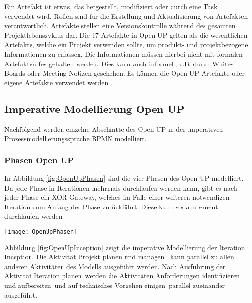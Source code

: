 Ein Artefakt ist etwas, das hergestellt, modifiziert oder durch eine Task verwendet wird. Rollen sind 
für die Erstellung und Aktualisierung von Artefakten verantwortlich. Artefakte stellen eine Versionskontrolle während des gesamten Projektlebenszyklus dar. Die 17 Artefakte in Open UP gelten als die wesentlichen Artefakte, welche ein Projekt verwenden sollte, um produkt- und projektbezogene Informationen zu erfassen. Die Informationen müssen hierbei nicht mit formalen Artefakten festgehalten werden. Dies kann auch informell, z.B. durch White-Boards oder Meeting-Notizen geschehen. Es können die Open UP Artefakte oder eigene Artefakte verwendet werden \cite{eclipseopenup}.

\subsection{Imperative Modellierung Open UP}

Nachfolgend werden einzelne Abschnitte des Open UP in der imperativen Prozessmodellierungssprache BPMN modelliert.

 \subsubsection{Phasen Open UP}

In Abbildung \ref{fig:OpenUpPhasen} sind die vier Phasen des Open UP modelliert. Da jede Phase in Iterationen mehrmals durchlaufen werden kann, gibt es nach jeder Phase ein XOR-Gateway, welches im Falle einer weiteren notwendigen Iteration zum Anfang der Phase zurückführt. Diese kann sodann erneut durchlaufen werden.

\begin{sidewaysfigure}[htp]
\begin{center}
  \texttt{[image: OpenUpPhasen]} %
  \caption{Phasen Open UP- imperativ}
  \label{fig:OpenUpPhasen}
\end{center}
\end{sidewaysfigure}

Abbildung \ref{fig:OpenUpInception} zeigt die imperative Modellierung der Iteration Inception. Die Aktivität \grqq Projekt planen und managen \grqq \ kann parallel zu allen anderen Aktivitäten des Modells ausgeführt werden.\newline
Nach Ausführung der Aktivität \grqq Iteration planen\grqq \ werden die Aktivitäten \grqq Anforderungen identifizieren und aufbereiten\grqq \ und \grqq auf technisches Vorgehen einigen\grqq \ parallel zueinander ausgeführt.


